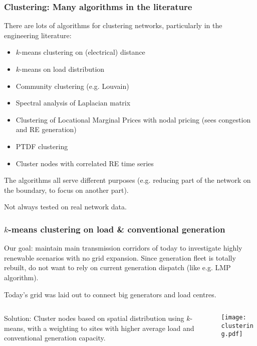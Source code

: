 \documentclass[10pt,aspectratio=169,dvipsnames]{beamer}
\let\olditem\item
\renewcommand{\item}{%
\olditem\vspace{5pt}}
\begin{document}
\begin{frame}
  \frametitle{Clustering: Many algorithms in the literature}

  There are lots of algorithms for clustering networks, particularly in the engineering literature:
  \begin{itemize}
    \item $k$-means clustering on (electrical) distance
    \item $k$-means on load distribution
    \item Community clustering (e.g. Louvain)
    \item Spectral analysis of Laplacian matrix
    \item Clustering of Locational Marginal Prices with nodal pricing (sees congestion and RE generation)
    \item PTDF clustering
    \item Cluster nodes with correlated RE time series
  \end{itemize}

  The algorithms all serve different purposes (e.g. reducing part of
  the network on the boundary, to focus on another part).

  Not always tested on real network data.
\end{frame}

\begin{frame}
  \frametitle{$k$-means clustering on load \& conventional generation}

  Our \alert{goal}: maintain main transmission corridors of today to
  investigate highly renewable scenarios with no grid expansion. Since generation fleet is totally rebuilt, do not want to rely on current generation dispatch (like e.g. LMP algorithm).

  Today's grid was laid out to connect big generators and load centres.

  \begin{columns}

    \begin{column}{5cm}

      \vspace{0.5cm}
  \alert{Solution}:
  Cluster nodes based on spatial distribution using $k$-means, with a weighting to sites with higher average load and conventional generation capacity.
    \end{column}

    \begin{column}{7cm}
      \vspace{.3cm}
            \texttt{[image: clustering.pdf]}
    \end{column}
\end{columns}
\end{frame}
\end{document}
